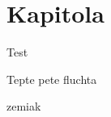 \documentclass{kris}
\begin{document}



%

%







\pagestyle{default}



\chapter{Kapitola}

Test

\newpage


Tepte pete fluchta

zemiak



%
%
%
%



\end{document}
